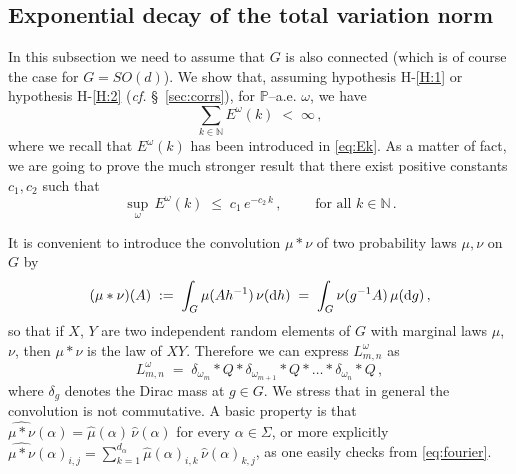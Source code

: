 \documentclass[a4paper,reqno,11pt]{amsart}
\numberwithin{equation}{section}
\newcommand{\bbP}{{\ensuremath{\mathbb P}} }
\newcommand{\cB}{{\ensuremath{\mathcal B}} }
\newcommand{\ga}{\alpha}
\newcommand{\gd}{\delta}
\newcommand{\go}{\omega}
\newcommand{\dd}{\text{\rm d}}             %
\newcommand{\N}{\mathbb{N}}
\DeclareMathOperator{\tr}{Tr}
\newcommand{\somb}{\widehat} %
\begin{document}

\smallskip

\subsection{Exponential decay of the total variation norm}

In this subsection we need to assume that $G$ is also connected
(which is of course the case for $G=SO(d)$).
We show that, assuming hypothesis H-\ref{H:1} or  hypothesis H-\ref{H:2}
({\sl cf.} \S~\ref{sec:corrs}), 
for $\bbP$--a.e. $\go$, we have
\begin{equation}
	\sum_{k \in \N} E^\go(k) \;<\; \infty\,,
\end{equation}
where we recall that $E^\go(k)$ has been introduced in \eqref{eq:Ek}.
As a matter of fact, we are going to prove the much stronger result
that there exist positive constants $c_1, c_2$ such that
\begin{equation} \label{eq:toprove}
	\sup_{\go} \, E^\go(k) \;\le\; c_1 \, e^{-c_2\, k}\,,
	\qquad \text{ for all } k \in \N \,.
\end{equation}

\smallskip

It is convenient to introduce the convolution $\mu*\nu$ of
two probability laws $\mu,\nu$ on $G$ by
\begin{equation}
	(\mu*\nu)(A) \;:=\; \int_G \mu(A h^{-1}) \, \nu(\dd h)
	\;=\; \int_G \nu(g^{-1}A) \, \mu(\dd g) \,,
\end{equation}
so that if $X$, $Y$ are two independent random elements of
$G$ with marginal laws $\mu$, $\nu$, then $\mu *\nu$ is the law of $XY$.
Therefore we can express $L^\go_{m,n}$ as
\begin{equation} \label{eq:multconv}
	L^\go_{m,n} \;=\; \gd_{\go_m} * Q * \gd_{\go_{m+1}} * Q * \ldots
	* \gd_{\go_n} * Q\,,
\end{equation}
where $\gd_{g}$ denotes the Dirac mass at $g \in G$.
We stress that in general the convolution is not commutative.
A basic property is that 
$\widehat{\mu*\nu}(\ga) = \somb\mu(\ga) \, \somb\nu(\ga)$ for every $\ga \in \Sigma$,
or more explicitly $\widehat{\mu*\nu}(\ga)_{i,j} = 
\sum_{k=1}^{d_\ga} \somb\mu(\ga)_{i,k} \, \somb\nu(\ga)_{k,j}$,
as one easily checks from \eqref{eq:fourier}.


\end{document}
